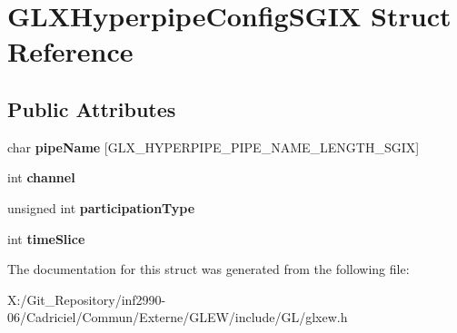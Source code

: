 \hypertarget{struct_g_l_x_hyperpipe_config_s_g_i_x}{\section{G\-L\-X\-Hyperpipe\-Config\-S\-G\-I\-X Struct Reference}
\label{struct_g_l_x_hyperpipe_config_s_g_i_x}
}
\subsection*{Public Attributes}
\begin{DoxyCompactItemize}
\item 
\hypertarget{struct_g_l_x_hyperpipe_config_s_g_i_x_a9e3748f92005cac81cb44d4c67acccb8}{char {\bfseries pipe\-Name} \mbox{[}G\-L\-X\-\_\-\-H\-Y\-P\-E\-R\-P\-I\-P\-E\-\_\-\-P\-I\-P\-E\-\_\-\-N\-A\-M\-E\-\_\-\-L\-E\-N\-G\-T\-H\-\_\-\-S\-G\-I\-X\mbox{]}}\label{struct_g_l_x_hyperpipe_config_s_g_i_x_a9e3748f92005cac81cb44d4c67acccb8}

\item 
\hypertarget{struct_g_l_x_hyperpipe_config_s_g_i_x_abc812d8796ba89d5de4e33b3532d8335}{int {\bfseries channel}}\label{struct_g_l_x_hyperpipe_config_s_g_i_x_abc812d8796ba89d5de4e33b3532d8335}

\item 
\hypertarget{struct_g_l_x_hyperpipe_config_s_g_i_x_a093cfaaec305531f66e1120929b5b01b}{unsigned int {\bfseries participation\-Type}}\label{struct_g_l_x_hyperpipe_config_s_g_i_x_a093cfaaec305531f66e1120929b5b01b}

\item 
\hypertarget{struct_g_l_x_hyperpipe_config_s_g_i_x_afe9288e75dc1ae5e0f33eff978d7024d}{int {\bfseries time\-Slice}}\label{struct_g_l_x_hyperpipe_config_s_g_i_x_afe9288e75dc1ae5e0f33eff978d7024d}

\end{DoxyCompactItemize}


The documentation for this struct was generated from the following file\-:\begin{DoxyCompactItemize}
\item 
X\-:/\-Git\-\_\-\-Repository/inf2990-\/06/\-Cadriciel/\-Commun/\-Externe/\-G\-L\-E\-W/include/\-G\-L/glxew.\-h\end{DoxyCompactItemize}
